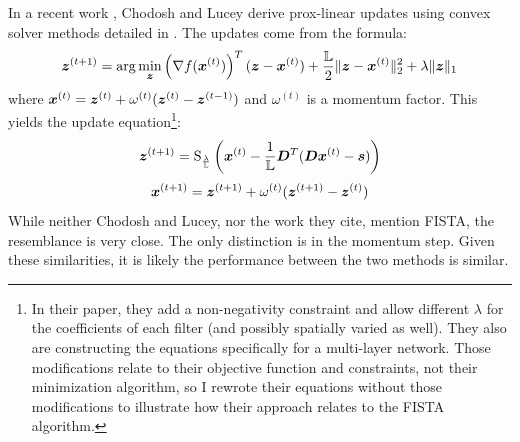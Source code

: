 In a recent work \cite{chodosh2020use}, Chodosh and Lucey derive prox-linear updates using convex solver methods detailed in \cite{xu2013block}. The updates come from the formula:
\begin{equation}
\bm{z}^{(t + 1)} = \arg\min_{\bm{z}} \left(\nabla f(\bm{x}^{(t)})\right)^T(\bm{z} - \bm{x}^{(t)}) + \frac{\mathbb{L}}{2}\|\bm{z} - \bm{x}^{(t)}\|_2^2 + \lambda\|\bm{z}\|_1
\end{equation}
%
where $\bm{x}^{(t)} = \bm{z}^{(t)} + \omega^{(t)}(\bm{z}^{(t)} - \bm{z}^{(t - 1)})$ and $\omega^{(t)}$ is a momentum factor. This yields the update equation\footnote{In their paper, they add a non-negativity constraint and allow different $\lambda$ for the coefficients of each filter (and possibly spatially varied as well). They also are constructing the equations specifically for a multi-layer network. Those modifications relate to their objective function and constraints, not their minimization algorithm, so I rewrote their equations without those modifications to illustrate how their approach relates to the FISTA algorithm.}:
\begin{equation}
\bm{z}^{(t + 1)} = \operatorname{S}_{\frac{\lambda}{\mathbb{L}}}\left(\bm{x}^{(t)} - \frac{1}{\mathbb{L}}\bm{D}^T(\bm{D}\bm{x}^{(t)} - \bm{s})\right)
\end{equation}
%
\begin{equation}
\bm{x}^{(t + 1)} = \bm{z}^{(t + 1)} + \omega^{(t)}(\bm{z}^{(t + 1)} - \bm{z}^{(t)})
\end{equation}
%
While neither Chodosh and Lucey, nor the work they cite, mention FISTA, the resemblance is very close. The only distinction is in the momentum step.  Given these similarities, it is likely the performance between the two methods is similar.

